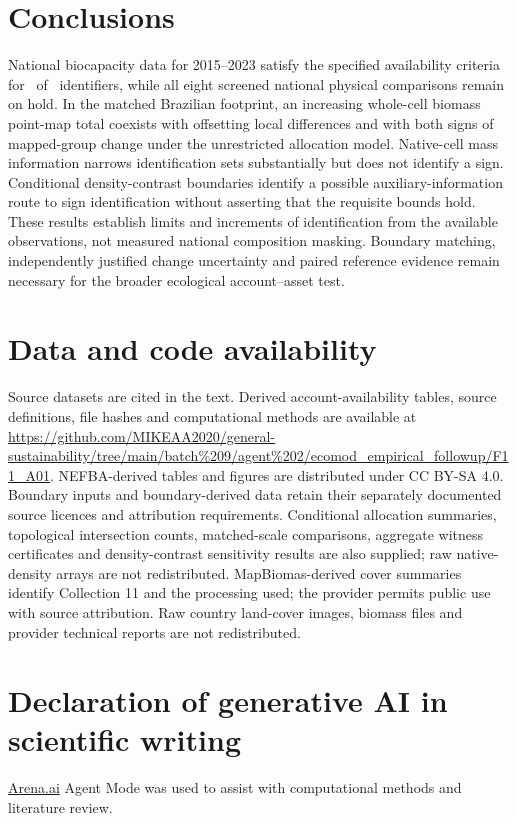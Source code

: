 \documentclass[11pt,a4paper]{article}
\begin{document}
\section{Conclusions}
National biocapacity data for 2015--2023 satisfy the specified availability criteria for \AccountPass\ of \CountryIDs\ identifiers, while all eight screened national physical comparisons remain on hold. In the matched Brazilian footprint, an increasing whole-cell biomass point-map total coexists with offsetting local differences and with both signs of mapped-group change under the unrestricted allocation model. Native-cell mass information narrows identification sets substantially but does not identify a sign. Conditional density-contrast boundaries identify a possible auxiliary-information route to sign identification without asserting that the requisite bounds hold. These results establish limits and increments of identification from the available observations, not measured national composition masking. Boundary matching, independently justified change uncertainty and paired reference evidence remain necessary for the broader ecological account--asset test.

\section*{Data and code availability}
Source datasets are cited in the text. Derived account-availability tables, source definitions, file hashes and computational methods are available at \url{https://github.com/MIKEAA2020/general-sustainability/tree/main/batch%209/agent%202/ecomod_empirical_followup/F11_A01}. NEFBA-derived tables and figures are distributed under CC BY-SA 4.0. Boundary inputs and boundary-derived data retain their separately documented source licences and attribution requirements. Conditional allocation summaries, topological intersection counts, matched-scale comparisons, aggregate witness certificates and density-contrast sensitivity results are also supplied; raw native-density arrays are not redistributed. MapBiomas-derived cover summaries identify Collection 11 and the processing used; the provider permits public use with source attribution. Raw country land-cover images, biomass files and provider technical reports are not redistributed.

\section*{Declaration of generative AI in scientific writing}
\href{http://Arena.ai}{Arena.ai} Agent Mode was used to assist with computational methods and literature review.
\end{document}
